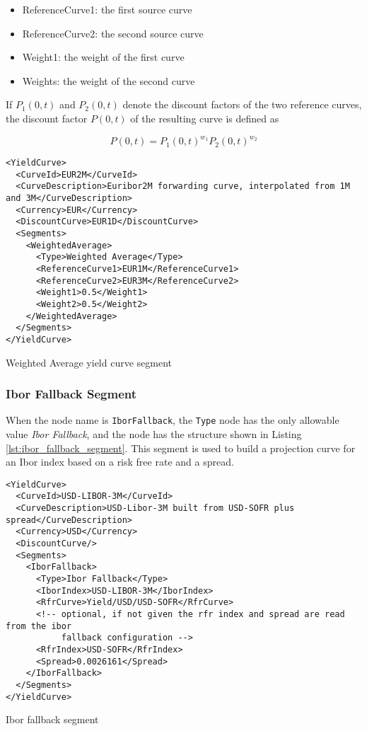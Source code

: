 \begin{itemize}
\item ReferenceCurve1: the first source curve
\item ReferenceCurve2: the second source curve
\item Weight1: the weight of the first curve
\item Weights: the weight of the second curve
\end{itemize}

If $P_1(0,t)$ and $P_2(0,t)$ denote the discount factors of the two reference curves, the discount factor $P(0,t)$ of
the resulting curve is defined as

\begin{equation}
P(0,t) = P_1(0,t)^{w_1}P_2(0,t)^{w_2}
\end{equation}

\begin{listing}[H]
\begin{verbatim}
<YieldCurve>
  <CurveId>EUR2M</CurveId>
  <CurveDescription>Euribor2M forwarding curve, interpolated from 1M and 3M</CurveDescription>
  <Currency>EUR</Currency>
  <DiscountCurve>EUR1D</DiscountCurve>
  <Segments>
    <WeightedAverage>
      <Type>Weighted Average</Type>
      <ReferenceCurve1>EUR1M</ReferenceCurve1>
      <ReferenceCurve2>EUR3M</ReferenceCurve2>
      <Weight1>0.5</Weight1>
      <Weight2>0.5</Weight2>
    </WeightedAverage>
  </Segments>
</YieldCurve>
\end{verbatim}
\caption{Weighted Average yield curve segment}
\label{lst:weighted_average_segment}
\end{listing}

\subsubsection*{Ibor Fallback Segment}
\label{sec:ibor_fallback_curve_segment}

When the node name is \lstinline!IborFallback!, the \lstinline!Type! node has the only allowable value \emph{Ibor
  Fallback}, and the node has the structure shown in Listing \ref{lst:ibor_fallback_segment}. This segment is used to
build a projection curve for an Ibor index based on a risk free rate and a spread.

\begin{listing}[H]
\begin{verbatim}
<YieldCurve>
  <CurveId>USD-LIBOR-3M</CurveId>
  <CurveDescription>USD-Libor-3M built from USD-SOFR plus spread</CurveDescription>
  <Currency>USD</Currency>
  <DiscountCurve/>
  <Segments>
    <IborFallback>
      <Type>Ibor Fallback</Type>
      <IborIndex>USD-LIBOR-3M</IborIndex>
      <RfrCurve>Yield/USD/USD-SOFR</RfrCurve>
      <!-- optional, if not given the rfr index and spread are read from the ibor
           fallback configuration -->
      <RfrIndex>USD-SOFR</RfrIndex>
      <Spread>0.0026161</Spread>
    </IborFallback>
  </Segments>
</YieldCurve>
\end{verbatim}
\caption{Ibor fallback segment}
\label{lst:ibor_fallback_segment}
\end{listing}

